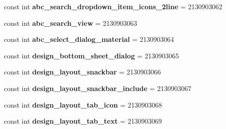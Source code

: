 \begin{DoxyCompactItemize}
\mbox{\label{class_sample_app_1_1_droid_1_1_resource_1_1_layout_a60c18c1618aa4baa91374ee9aa642f04}} 
const int {\bfseries abc\+\_\+search\+\_\+dropdown\+\_\+item\+\_\+icons\+\_\+2line} = 2130903062
\item 
\mbox{\label{class_sample_app_1_1_droid_1_1_resource_1_1_layout_aef2312b70723a0478c82e054ce9f86b1}} 
const int {\bfseries abc\+\_\+search\+\_\+view} = 2130903063
\item 
\mbox{\label{class_sample_app_1_1_droid_1_1_resource_1_1_layout_a06196afc45ead34495277ed7319b300f}} 
const int {\bfseries abc\+\_\+select\+\_\+dialog\+\_\+material} = 2130903064
\item 
\mbox{\label{class_sample_app_1_1_droid_1_1_resource_1_1_layout_a3c5c5842515635932d356b5f80f1216d}} 
const int {\bfseries design\+\_\+bottom\+\_\+sheet\+\_\+dialog} = 2130903065
\item 
\mbox{\label{class_sample_app_1_1_droid_1_1_resource_1_1_layout_ae198b6649140a3ea2d43995689503f7d}} 
const int {\bfseries design\+\_\+layout\+\_\+snackbar} = 2130903066
\item 
\mbox{\label{class_sample_app_1_1_droid_1_1_resource_1_1_layout_a0ad25388e99cf241e62e3691a4273e5e}} 
const int {\bfseries design\+\_\+layout\+\_\+snackbar\+\_\+include} = 2130903067
\item 
\mbox{\label{class_sample_app_1_1_droid_1_1_resource_1_1_layout_a7acca209778a491c721890dc86a4e60d}} 
const int {\bfseries design\+\_\+layout\+\_\+tab\+\_\+icon} = 2130903068
\item 
\mbox{\label{class_sample_app_1_1_droid_1_1_resource_1_1_layout_aaaf2ecd142b078ffadb60a7f69c3964b}} 
const int {\bfseries design\+\_\+layout\+\_\+tab\+\_\+text} = 2130903069
\item 
\mbox{\label{class_sample_app_1_1_droid_1_1_resource_1_1_layout_a1fc50703f0bd195105e420eb0051f6b7}} 

\end{DoxyCompactItemize}
